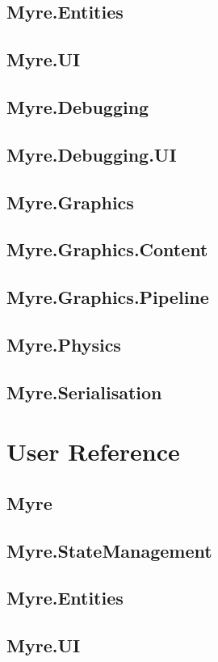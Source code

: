 \documentclass{article}
\begin{document}
\subsection{Myre.Entities}
\subsection{Myre.UI}
\subsection{Myre.Debugging}
\subsection{Myre.Debugging.UI}
\subsection{Myre.Graphics}
\subsection{Myre.Graphics.Content}
\subsection{Myre.Graphics.Pipeline}
\subsection{Myre.Physics}
\subsection{Myre.Serialisation}

\section{User Reference}
\subsection{Myre}
\subsection{Myre.StateManagement}
\subsection{Myre.Entities}
\subsection{Myre.UI}
\end{document}
